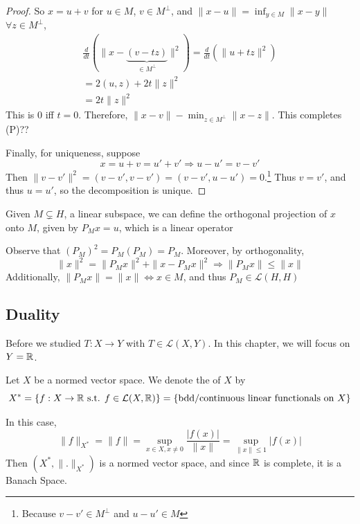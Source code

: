 \begin{proof}
    So $x = u + v$ for $u \in M$, $v \in M^\perp$, and $\| x - u \|  = \inf_{y \in M} \| x - y \|$
    $\forall z \in M^\perp$, 
    \begin{align*}
        \frac{d}{dt}( \| x - \underbrace{(v - tz)}_{\in M^\perp} \|^2 ) = \frac{d}{dt} (\| u + tz \|^2) \\
        = 2(u, z) + 2t \| z \|^2 \\
        = 2t \| z \|^2  
    \end{align*}    
    This is $0$ iff $t = 0$. Therefore, $\| x - v \| - \min_{z \in M^\perp} \| x - z \|$. This completes (P)??
    
    Finally, for uniqueness, suppose
    \[
        x = u + v = u' + v' \Rightarrow u- u' = v - v'
    \] 
    Then $\| v - v' \|^2 = (v - v', v- v') = (v - v', u - u') = 0$.\footnote{Because $v - v' \in M^\perp$ and $u - u' \in M$}
    Thus $v = v'$, and thus $u = u'$, so the decomposition is unique. \qedhere

\end{proof}
\begin{rem}
    Given $M \subsetneq H$, a linear subspace, we can define the orthogonal projection of $x$ onto $M$,
    given by $P_M x = u$, which is a linear operator
    
    Observe that $(P_M)^2 = P_M(P_M) = P_M$. Moreover, by orthogonality, 
    \[
        \| x \|^2 = \| P_M x \|^2 + \|  x - P_M x \|^2 \Rightarrow \| P_M x \| \leq \| x \|     
    \]  
    Additionally, $\| P_M x \| = \| x \|  \iff x \in M$, and thus $P_M \in \mathcal{L}(H, H)$  
\end{rem}   

\subsection{Duality}
Before we studied $T : X \to Y$ with $T \in \mathcal{L}(X, Y)$. In this chapter, we will focus
on $Y = \mathbb{R}$.
\begin{defn}[$X^*$]
    Let $X$ be a normed vector space. We denote the  of $X$ by
    \[
        X^* = \left\{ f : X \to \mathbb{R} \text{ s.t. } f \in \mathcal{L}(X, \mathbb{R}) \right\} =
        \left\{ \text{bdd/continuous linear functionals on } X \right\}
    \] 

    In this case, \[
    \| f \|_{X^*}  = \| f \| = \sup_{x \in X, x \neq 0} \frac{|f(x)|}{\| x \| } = 
    \sup_{\| x \| \leq 1} |f(x)|
    \]
    Then $(X^*, \| . \|_{X^*} )$ is a normed vector space, and since $\mathbb{R}$ is complete, it is a Banach Space. 
\end{defn} 

